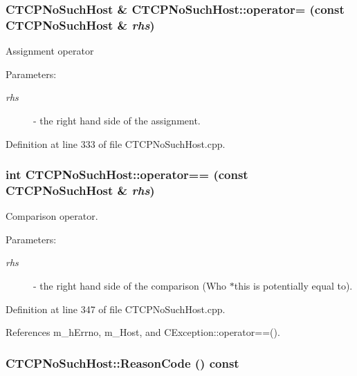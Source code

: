 \subsubsection{\setlength{\rightskip}{0pt plus 5cm}CTCPNo\-Such\-Host \& CTCPNo\-Such\-Host::operator= (const CTCPNo\-Such\-Host \& {\em rhs})}\label{classCTCPNoSuchHost_a3}


Assignment operator\begin{Desc}
\item[Parameters: ]\par
\begin{description}
\item[{\em 
rhs}]- the right hand side of the assignment. \end{description}
\end{Desc}


Definition at line 333 of file CTCPNo\-Such\-Host.cpp.
\subsubsection{\setlength{\rightskip}{0pt plus 5cm}int CTCPNo\-Such\-Host::operator== (const CTCPNo\-Such\-Host \& {\em rhs})}\label{classCTCPNoSuchHost_a4}


Comparison operator.\begin{Desc}
\item[Parameters: ]\par
\begin{description}
\item[{\em 
rhs}]- the right hand side of the comparison (Who $\ast$this is potentially equal to). \end{description}
\end{Desc}


Definition at line 347 of file CTCPNo\-Such\-Host.cpp.

References m\_\-h\-Errno, m\_\-Host, and CException::operator==().
\subsubsection{ CTCPNo\-Such\-Host::Reason\-Code () const\hspace{0.3cm}{\tt  [virtual]}}\label{classCTCPNoSuchHost_a8}



